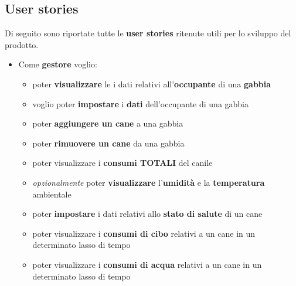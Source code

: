         \subsection{User stories}
        Di seguito sono riportate tutte le \textbf{user stories} ritenute utili per lo sviluppo del prodotto.
        \begin{itemize}
            \item Come \textbf{gestore}
            voglio:
            \begin{itemize}
                \item poter \textbf{visualizzare} le i dati relativi all’\textbf{occupante} di una \textbf{gabbia}
                \item voglio poter \textbf{impostare} i \textbf{dati} dell’occupante di una gabbia
                \item poter \textbf{aggiungere un cane }a una gabbia
                \item poter\textbf{ rimuovere un cane} da una gabbia
                \item poter visualizzare i \textbf{consumi TOTALI} del canile
                \item \textit{opzionalmente} poter \textbf{visualizzare} l’\textbf{umidità} e la \textbf{temperatura} ambientale 
                \item poter \textbf{impostare} i dati relativi allo \textbf{stato di salute} di un cane
                \item poter visualizzare i \textbf{consumi di cibo} relativi a un cane in un determinato lasso di tempo
                \item poter visualizzare i \textbf{consumi di acqua} relativi a un cane in un determinato lasso di tempo
            \end{itemize}
            

\end{itemize}
